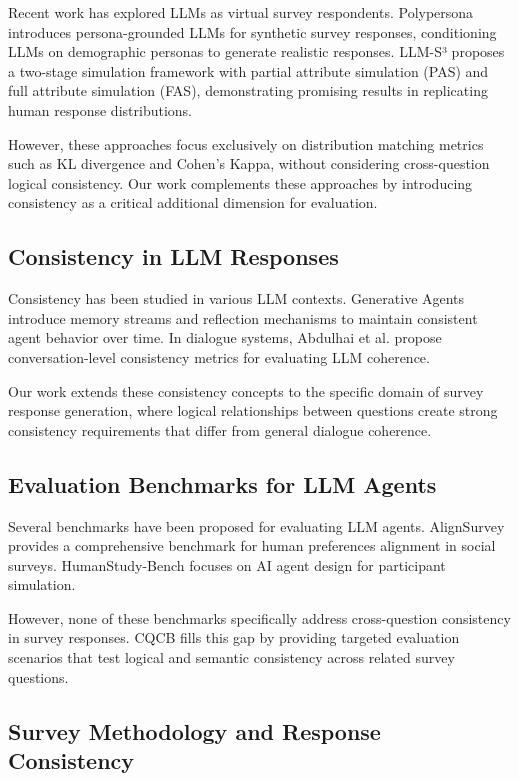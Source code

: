 \documentclass[sigconf, anonymous]{acmart}
\begin{document}
Recent work has explored LLMs as virtual survey respondents. Polypersona introduces persona-grounded LLMs for synthetic survey responses, conditioning LLMs on demographic personas to generate realistic responses. LLM-S³ proposes a two-stage simulation framework with partial attribute simulation (PAS) and full attribute simulation (FAS), demonstrating promising results in replicating human response distributions.

However, these approaches focus exclusively on distribution matching metrics such as KL divergence and Cohen's Kappa, without considering cross-question logical consistency. Our work complements these approaches by introducing consistency as a critical additional dimension for evaluation.

\subsection{Consistency in LLM Responses}

Consistency has been studied in various LLM contexts. Generative Agents introduce memory streams and reflection mechanisms to maintain consistent agent behavior over time. In dialogue systems, Abdulhai et al. propose conversation-level consistency metrics for evaluating LLM coherence.

Our work extends these consistency concepts to the specific domain of survey response generation, where logical relationships between questions create strong consistency requirements that differ from general dialogue coherence.

\subsection{Evaluation Benchmarks for LLM Agents}

Several benchmarks have been proposed for evaluating LLM agents. AlignSurvey provides a comprehensive benchmark for human preferences alignment in social surveys. HumanStudy-Bench focuses on AI agent design for participant simulation.

However, none of these benchmarks specifically address cross-question consistency in survey responses. CQCB fills this gap by providing targeted evaluation scenarios that test logical and semantic consistency across related survey questions.

\subsection{Survey Methodology and Response Consistency}
\end{document}
